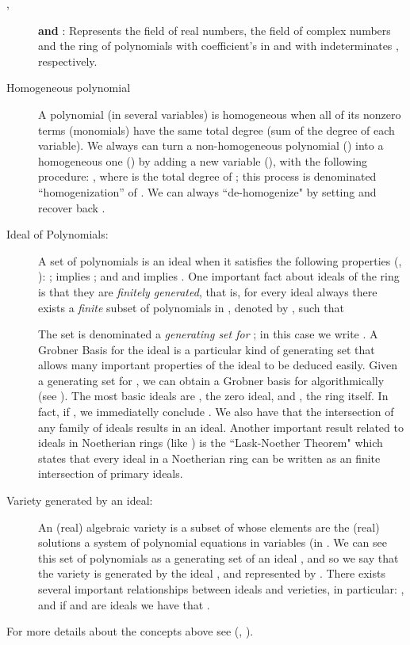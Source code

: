 \documentclass{article}
\begin{document}
\begin{description}

\item[, ] {\bf and} :
Represents the field of real numbers, the
field of complex numbers and the ring of polynomials with coefficient's in
 and with indeterminates 
, respectively.

\item [Homogeneous polynomial] A polynomial (in several variables) is
homogeneous when all of its nonzero terms (monomials)
have the same total degree (sum of the degree of each variable). We always
can turn a non-homogeneous polynomial () into a homogeneous one ()
by adding a new variable (), with the following procedure:
, where  is the total degree of ; this process is
denominated ``homogenization'' of .   We can always ``de-homogenize"
 by setting  and recover back .

\item[Ideal of Polynomials:] A set of polynomials 
 is an ideal when
it satisfies the following properties (\cite{clo}, \cite{am}): 
 ; 
  implies ; and 
  and  implies .
One important fact about ideals of the ring  is that they
are {\em finitely generated}, that is, for every ideal  always there exists a {\em finite} subset of 
polynomials in , denoted by , such that 
 
The set  is denominated a {\em generating set for }; in this case
we write . A Grobner Basis for the ideal 
 is a particular kind of generating set that allows many important 
properties of the ideal to be deduced easily. Given a generating 
set  for , we can obtain a Grobner basis
 for  algorithmically (see \cite[Ch.~2]{clo}).
The most basic ideals are , the zero ideal, and
, the ring  itself. In fact, 
if , we immediatelly conclude .
We also have that the intersection of any family of ideals results in an ideal.
Another important result related to ideals in Noetherian rings (like
) is the ``Lask-Noether Theorem" which 
states that every ideal in a Noetherian ring can be written as an finite intersection
of primary ideals.

\item[Variety generated by an ideal:] An (real) algebraic variety is a subset of  
whose elements are the (real) solutions a system of polynomial equations in  variables
 (in .
We can see this set of polynomials as a generating set of an ideal , and so we say
that the variety is generated by the ideal , and represented by . 
There exists several important relationships between ideals and verieties, in particular: 
,  and 
if  and  are ideals we have that .

\end{description}
For more details about the concepts above see (\cite{clo}, \cite{am}).
\end{document}
